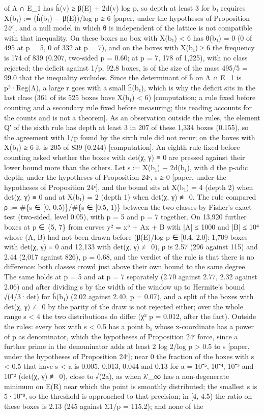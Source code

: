 \documentclass[11pt,a4paper]{article}
\theoremstyle{named}
\begin{document}
of Λ ∩ E\_1 has ĥ(v) ≥ β(E) + 2d(v) log p, so depth at least 3 for b₁ requires X(b₁) := (ĥ(b₁) − β(E))/log p ≥ 6 [paper, under the hypotheses of Proposition 24ᶜ], and a null model in which θ is independent of the lattice is not compatible with that inequality. On these boxes no box with X(b₁) \textless{} 6 has θ(b₁) = 0 (0 of 495 at p = 5, 0 of 332 at p = 7), and on the boxes with X(b₁) ≥ 6 the frequency is 174 of 839 (0.207, two-sided p = 0.60; at p = 7, 178 of 1,225), with no class rejected; the deficit against 1/p, 92.8 boxes, is of the size of the mass 495/5 = 99.0 that the inequality excludes. Since the determinant of ĥ on Λ ∩ E\_1 is p²·Reg(Λ), a large r goes with a small ĥ(b₁), which is why the deficit sits in the last class (361 of its 525 boxes have X(b₁) \textless{} 6) [computation; a rule fixed before counting and a secondary rule fixed before measuring; this reading accounts for the counts and is not a theorem]. As an observation outside the rules, the element Q′ of the sixth rule has depth at least 3 in 207 of these 1,334 boxes (0.155), so the agreement with 1/p found by the sixth rule did not recur; on the boxes with X(b₁) ≥ 6 it is 205 of 839 (0.244) [computation]. An eighth rule fixed before counting asked whether the boxes with det(χ, γ) ≡ 0 are pressed against their lower bound more than the others. Let s := X(b₁) − 2d(b₁), with d the p-adic depth; under the hypotheses of Proposition 24ᶜ, s ≥ 0 [paper, under the hypotheses of Proposition 24ᶜ], and the bound sits at X(b₁) = 4 (depth 2) when det(χ, γ) ≡ 0 and at X(b₁) = 2 (depth 1) when det(χ, γ) ≢ 0. The rule compared ρ := \#\{s ∈ [0, 0.5)\}/\#\{s ∈ [0.5, 1)\} between the two classes by Fisher's exact test (two-sided, level 0.05), with p = 5 and p = 7 together. On 13,920 further boxes at p ∈ \{5, 7\} from curves y² = x³ + Ax + B with |A| ≤ 1000 and |B| ≤ 10⁴ whose (A, B) had not been drawn before (β(E)/log p ∈ [0.4, 2.0]: 1,709 boxes with det(χ, γ) ≡ 0 and 12,133 with det(χ, γ) ≢ 0), ρ is 2.57 (296 against 115) and 2.44 (2,017 against 826), p = 0.68, and the verdict of the rule is that there is no difference: both classes crowd just above their own bound to the same degree. The same holds at p = 5 and at p = 7 separately (2.70 against 2.77, 2.32 against 2.06) and after dividing s by the width of the window up to Hermite's bound √(4/3·det) for ĥ(b₁) (2.02 against 2.40, p = 0.07), and a split of the boxes with det(χ, γ) ≢ 0 by the parity of the draw is not rejected either; over the whole range s \textless{} 4 the two distributions do differ (χ² p = 0.012, after the fact). Outside the rules: every box with s \textless{} 0.5 has a point b₁ whose x-coordinate has a power of p as denominator, which the hypotheses of Proposition 24ᶜ force, since a further prime in the denominator adds at least 2 log 2/log p \textgreater{} 0.5 to s [paper, under the hypotheses of Proposition 24ᶜ]; near 0 the fraction of the boxes with s \textless{} 0.5 that have s \textless{} a is 0.005, 0.013, 0.044 and 0.13 for a = 10⁻⁵, 10⁻⁴, 10⁻³ and 10⁻² (det(χ, γ) ≢ 0), close to √(2a), as when λ′\_∞ has a non-degenerate minimum on E(R) near which the point is smoothly distributed; the smallest s is 5·10⁻⁸, so the threshold is approached to that precision; in [4, 4.5) the ratio on these boxes is 2.13 (245 against Σ1/p = 115.2); and none of the 
\end{document}
